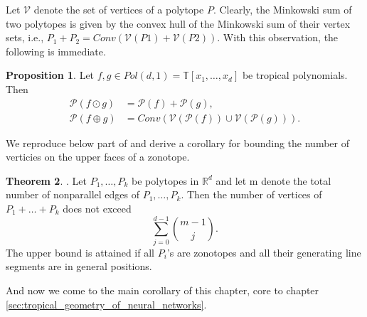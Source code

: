 \documentclass{article}
\theoremstyle{definition}
\newtheorem{theorem}{Theorem}[section]
\newtheorem{proposition}[theorem]{Proposition}
\begin{document}
Let $\mathcal{V}$ denote the set of vertices of a polytope $P$. Clearly, the Minkowski sum of two polytopes is given by the convex hull of the Minkowski sum of their vertex sets, i.e., $P_{1} + P_{2} = Conv(\mathcal{V}(P1) + \mathcal{V}(P2))$. With this observation, the
following is immediate.

\begin{proposition} \cite[p.~4]{zhang2018tropical}
Let $f, g \in Pol(d, 1) = \mathbb{T}[x_1, \dots , x_d]$ be tropical polynomials. Then
\begin{align*}
\mathcal{P}(f \odot g) &= \mathcal{P}(f) + \mathcal{P}(g), \\
\mathcal{P}(f \oplus g) &= Conv(\mathcal{V}(\mathcal{P}(f)) \cup \mathcal{V}( \mathcal{P}(g))).
\end{align*}
\end{proposition}

We reproduce below part of \cite[Theorem 2.1.20]{gritzmann1993minkowski} and derive a corollary for bounding the number of verticies on the upper faces of a zonotope.

\begin{theorem}
\label{theo:gritzmann_sturmfels}
\cite{gritzmann1993minkowski}. Let $P_1, \dots , P_k$ be polytopes in $\mathbb{R}^{d}$ and let m denote the total number of nonparallel edges of $P_1, \dots , P_k$. Then the number of vertices of $P_1 + \dots + P_k$ does not exceed
$$\sum_{j=0}^{d-1} \binom{m-1}{j}.$$
The upper bound is attained if all $P_i$'s are zonotopes and all their generating line segments are in general positions.
\end{theorem}

And now we come to the main corollary of this chapter, core to chapter \ref{sec:tropical_geometry_of_neural_networks}.
\end{document}
